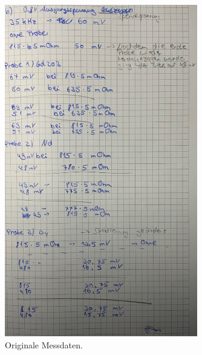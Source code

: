 \begin{figure}[H]
    \centering
    \includegraphics[width=0.75\textwidth]{data/origDaten2.jpg}
    \caption{Originale Messdaten.}
    \label{fig:daten1}
\end{figure}